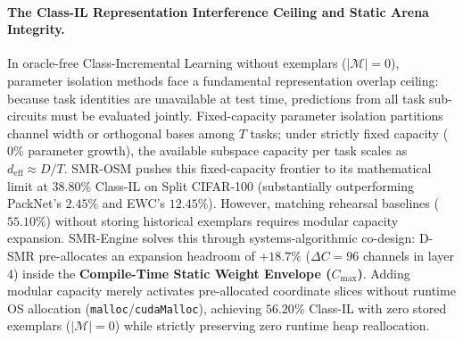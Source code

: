 \documentclass{article}
\begin{document}
\paragraph{The Class-IL Representation Interference Ceiling and Static Arena Integrity.}
In oracle-free Class-Incremental Learning without exemplars ($|\mathcal{M}|=0$), parameter isolation methods face a fundamental representation overlap ceiling: because task identities are unavailable at test time, predictions from all task sub-circuits must be evaluated jointly. Fixed-capacity parameter isolation partitions channel width or orthogonal bases among $T$ tasks; under strictly fixed capacity ($0\%$ parameter growth), the available subspace capacity per task scales as $d_{\text{eff}} \approx D/T$. SMR-OSM pushes this fixed-capacity frontier to its mathematical limit at $\mathbf{38.80\%}$ Class-IL on Split CIFAR-100 (substantially outperforming PackNet's $2.45\%$ and EWC's $12.45\%$). However, matching rehearsal baselines ($55.10\%$) without storing historical exemplars requires modular capacity expansion. SMR-Engine solves this through systems-algorithmic co-design: D-SMR pre-allocates an expansion headroom of $+18.7\%$ ($\Delta C = 96$ channels in layer 4) inside the \textbf{Compile-Time Static Weight Envelope ($C_{\max}$)}. Adding modular capacity merely activates pre-allocated coordinate slices without runtime OS allocation (\texttt{malloc}/\texttt{cudaMalloc}), achieving $\mathbf{56.20\%}$ Class-IL with zero stored exemplars ($|\mathcal{M}|=0$) while strictly preserving zero runtime heap reallocation.
\end{document}
